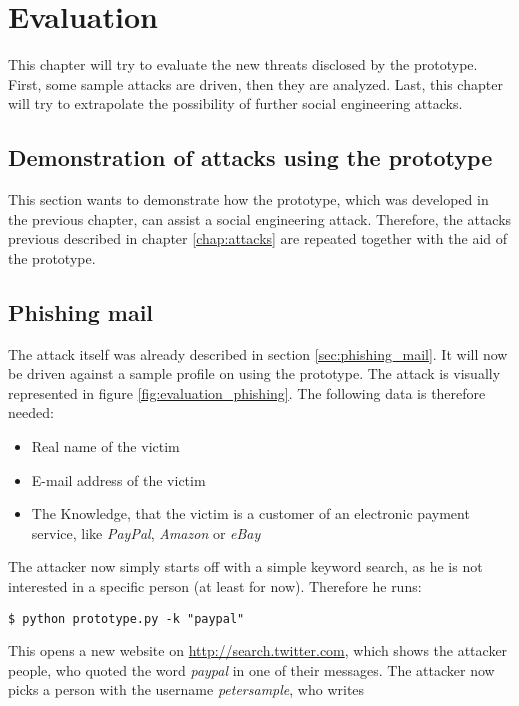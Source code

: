 \chapter{Evaluation}
\label{chap:evaluation}

This chapter will try to evaluate the new threats disclosed by the prototype.
First, some sample attacks are driven, then they are analyzed. Last, this
chapter will try to extrapolate the possibility of further social engineering
attacks.

\section{Demonstration of attacks using the prototype}

This section wants to demonstrate how the prototype, which was
developed in the previous chapter, can assist a social engineering attack.
Therefore, the attacks previous described in chapter \ref{chap:attacks} are
repeated together with the aid of the prototype.

\section{Phishing mail}

The attack itself was already described in section \ref{sec:phishing_mail}. It
will now be driven against a sample profile on \Twitter{} using the prototype.
The attack is visually represented in figure \ref{fig:evaluation_phishing}.
The following data is therefore needed:

\begin{itemize}
  \item Real name of the victim
  \item E-mail address of the victim
  \item The Knowledge, that the victim is a customer of an electronic
  payment service, like \textit{PayPal}, \textit{Amazon} or \textit{eBay}
\end{itemize}

The attacker now simply starts off with a simple keyword search, as he is not
interested in a specific person (at least for now). Therefore he runs:

\lstset{language=bash}
\begin{lstlisting}
$ python prototype.py -k "paypal"
\end{lstlisting}

This opens a new website on \url{http://search.twitter.com}, which shows the
attacker people, who quoted the word \textit{paypal} in one of their messages.
The attacker now picks a person with the username \textit{petersample}, who writes


